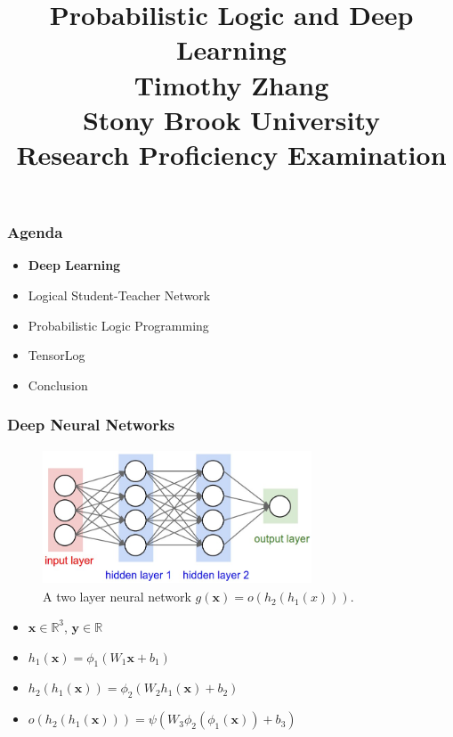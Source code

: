 \documentclass{beamer}
\title{Probabilistic Logic and Deep Learning\\
\large Timothy Zhang\\
Stony Brook University\\
Research Proficiency Examination}
\date{}							%
\begin{document}
	\maketitle
	
\begin{frame}
	\frametitle{Agenda}
	\begin{itemize}
		\item \textbf{Deep Learning}
		\item Logical Student-Teacher Network
		\item Probabilistic Logic Programming
		\item TensorLog
		\item Conclusion
	\end{itemize}
\end{frame}

\begin{frame}
\frametitle{Deep Neural Networks}
\begin{figure}
	\begin{center}
		\includegraphics[width=8cm, height=4cm]{dnn}
	\end{center}
	\caption{A two layer neural network $g(\textbf{x}) = o(h_2(h_1(x)))$.}
\end{figure}
\begin{itemize}
	\item $\textbf{x} \in \mathbb{R}^3$, $\textbf{y} \in \mathbb{R}$
	\item $h_1(\textbf{x}) = \phi_1(W_1 \textbf{x} + b_1)$
	\item $h_2(h_1(\textbf{x})) = \phi_2(W_2 h_1(\textbf{x}) + b_2)$
	\item $o(h_2(h_1(\textbf{x}))) = \psi(W_3 \phi_2(\phi_1(\textbf{x})) + b_3)$
\end{itemize}
\end{frame}
\end{document}
